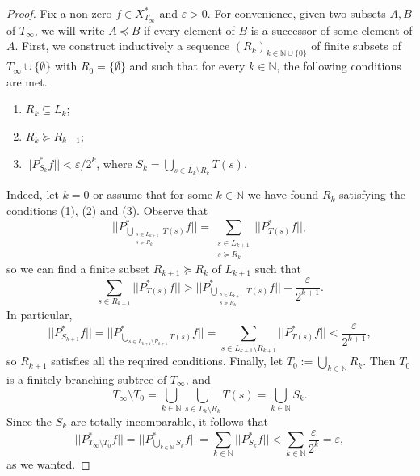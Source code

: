 \documentclass[10pt,a4paper]{amsart}
\newcommand{\N}{\mathbb{N}}
\begin{document}
\begin{proof}
 Fix a non-zero $f\in X_{T_\infty}^*$ and $\varepsilon>0$. For convenience, given two subsets $A,B$ of $T_\infty$, we will write $A\preceq B$ if every element of $B$ is a successor of some element of $A$.  First, we construct inductively a sequence $(R_k)_{k\in \N\cup\{0\}}$ of finite subsets of $T_\infty\cup\{\emptyset\}$ with $R_0=\{\emptyset\}$ and such that for every $k\in\mathbb{N}$, the following conditions are met.
    \begin{enumerate}
        \item $R_k\subseteq L_k$;
        \item $R_k\succeq R_{k-1}$;
        \item $||P^*_{S_k}f||<\varepsilon/2^k$, where $S_k = \bigcup_{s\in L_k\setminus R_k}T(s)$.
    \end{enumerate} Indeed, let $k=0$ or assume that for some $k\in\N$ we have found $R_k$ satisfying the conditions (1), (2) and (3). Observe that \begin{equation*}
        ||P^*_{\bigcup_{\substack{s\in L_{k+1}\\
    s\succeq R_k}}T(s)}f|| = \sum_{\substack{s\in L_{k+1}\\ s\succeq R_k}} ||P^*_{T(s)}f||,
    \end{equation*}
    so we can find a finite subset $R_{k+1}\succeq R_k$ of $L_{k+1}$ such that\begin{equation*}
        \sum_{s\in R_{k+1}}||P^*_{T(s)}f|| >  ||P^*_{\bigcup_{\substack{s\in L_{k+1}\\ s \succeq R_{k}}}T(s)}f||- \frac{\varepsilon}{2^{k+1}}.
    \end{equation*}
    In particular, \begin{equation*}
        ||P^*_{S_{k+1}}f|| = ||P^*_{\bigcup_{s\in L_{k+1}\setminus R_{k+1}}T(s)}f|| = \sum_{s\in L_{k+1}\setminus R_{k+1}}||P^*_{T(s)}f||<\frac{\varepsilon}{2^{k+1}},
    \end{equation*} so $R_{k+1}$ satisfies all the required conditions. Finally, let $T_0:= \bigcup_{k\in\mathbb{N}} R_k$. Then $T_0$ is a finitely branching subtree of $T_\infty$, and 
\begin{equation*}
    T_{\infty}\setminus T_0 = \bigcup_{k\in\mathbb{N}}\bigcup_{s\in L_k\setminus R_k} T(s) = \bigcup_{k\in\mathbb{N}}S_k.
\end{equation*} Since the $S_k$ are totally incomparable, it follows that \begin{equation*}
     || P^*_{T_{\infty}\setminus T_0}f|| = ||P^*_{\bigcup_{k\in\mathbb{N}}S_k}f|| = \sum_{k\in\mathbb{N}}||P^*_{S_k}f|| < \sum_{k\in\mathbb{N}}\frac{\varepsilon}{2^k}=\varepsilon,
\end{equation*} as we wanted.
\end{proof}
\end{document}

